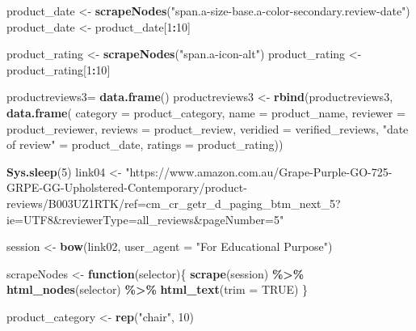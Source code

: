 \documentclass[
]{article}
\newenvironment{Shaded}{\begin{snugshade}}{\end{snugshade}}
\newcommand{\AttributeTok}[1]{\textcolor[rgb]{0.13,0.29,0.53}{#1}}
\newcommand{\ConstantTok}[1]{\textcolor[rgb]{0.56,0.35,0.01}{#1}}
\newcommand{\ControlFlowTok}[1]{\textcolor[rgb]{0.13,0.29,0.53}{\textbf{#1}}}
\newcommand{\DecValTok}[1]{\textcolor[rgb]{0.00,0.00,0.81}{#1}}
\newcommand{\FunctionTok}[1]{\textcolor[rgb]{0.13,0.29,0.53}{\textbf{#1}}}
\newcommand{\NormalTok}[1]{#1}
\newcommand{\OtherTok}[1]{\textcolor[rgb]{0.56,0.35,0.01}{#1}}
\newcommand{\SpecialCharTok}[1]{\textcolor[rgb]{0.81,0.36,0.00}{\textbf{#1}}}
\newcommand{\StringTok}[1]{\textcolor[rgb]{0.31,0.60,0.02}{#1}}
\begin{document}
\begin{Shaded}
\begin{Highlighting}[]
\NormalTok{  product\_date }\OtherTok{\textless{}{-}} \FunctionTok{scrapeNodes}\NormalTok{(}\StringTok{"span.a{-}size{-}base.a{-}color{-}secondary.review{-}date"}\NormalTok{)}
\NormalTok{  product\_date }\OtherTok{\textless{}{-}}\NormalTok{ product\_date[}\DecValTok{1}\SpecialCharTok{:}\DecValTok{10}\NormalTok{]}
  
\NormalTok{  product\_rating }\OtherTok{\textless{}{-}} \FunctionTok{scrapeNodes}\NormalTok{(}\StringTok{"span.a{-}icon{-}alt"}\NormalTok{)}
\NormalTok{  product\_rating }\OtherTok{\textless{}{-}}\NormalTok{ product\_rating[}\DecValTok{1}\SpecialCharTok{:}\DecValTok{10}\NormalTok{]}
  
\NormalTok{  productreviews3}\OtherTok{=} \FunctionTok{data.frame}\NormalTok{()}
\NormalTok{  productreviews3 }\OtherTok{\textless{}{-}} \FunctionTok{rbind}\NormalTok{(productreviews3, }\FunctionTok{data.frame}\NormalTok{(}
                      \AttributeTok{category =}\NormalTok{ product\_category,}
                      \AttributeTok{name =}\NormalTok{ product\_name,}
                      \AttributeTok{reviewer =}\NormalTok{ product\_reviewer,}
                      \AttributeTok{reviews =}\NormalTok{ product\_review,}
                      \AttributeTok{veridied =}\NormalTok{ verified\_reviews,}
                      \StringTok{"date of review"} \OtherTok{=}\NormalTok{ product\_date,}
                      \AttributeTok{ratings =}\NormalTok{ product\_rating))}
  
   \FunctionTok{Sys.sleep}\NormalTok{(}\DecValTok{5}\NormalTok{)}
\NormalTok{link04 }\OtherTok{\textless{}{-}} \StringTok{"https://www.amazon.com.au/Grape{-}Purple{-}GO{-}725{-}GRPE{-}GG{-}Upholstered{-}Contemporary/product{-}reviews/B003UZ1RTK/ref=cm\_cr\_getr\_d\_paging\_btm\_next\_5?ie=UTF8\&reviewerType=all\_reviews\&pageNumber=5"}


\NormalTok{  session }\OtherTok{\textless{}{-}} \FunctionTok{bow}\NormalTok{(link02,}
               \AttributeTok{user\_agent =} \StringTok{"For Educational Purpose"}\NormalTok{)}

\NormalTok{  scrapeNodes }\OtherTok{\textless{}{-}} \ControlFlowTok{function}\NormalTok{(selector)\{}
    \FunctionTok{scrape}\NormalTok{(session) }\SpecialCharTok{\%\textgreater{}\%}
      \FunctionTok{html\_nodes}\NormalTok{(selector) }\SpecialCharTok{\%\textgreater{}\%}
      \FunctionTok{html\_text}\NormalTok{(}\AttributeTok{trim =} \ConstantTok{TRUE}\NormalTok{)}
\NormalTok{  \}}

\NormalTok{  product\_category }\OtherTok{\textless{}{-}} \FunctionTok{rep}\NormalTok{(}\StringTok{"chair"}\NormalTok{, }\DecValTok{10}\NormalTok{)}


\end{Highlighting}
\end{Shaded}
\end{document}
